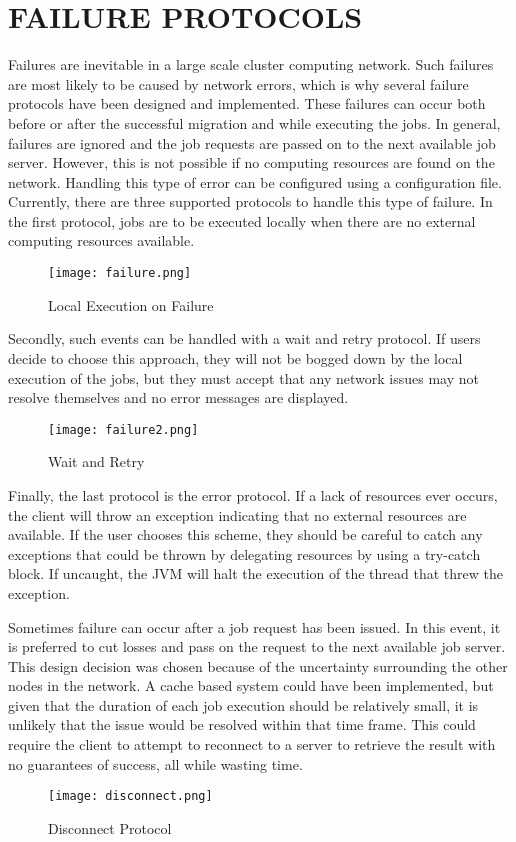 \section{FAILURE PROTOCOLS}\label{sec:failureProtocols}

Failures are inevitable in a large scale cluster computing network.
Such failures are most likely to be caused by network errors, which
is why several failure protocols have been designed and implemented.
These failures can occur both before or after the successful
migration and while executing the jobs.
In general, failures are ignored and the job requests are passed
on to the next available job server.
However, this is not possible if no computing resources are
found on the network.
Handling this type of error can be configured
using a configuration file.
Currently, there are three supported protocols to handle
this type of failure.
In the first protocol, jobs are to be executed locally when
there are no external computing resources available.

\begin{figure}[H]
    \centering
    \texttt{[image: failure.png]}
    \caption{Local Execution on Failure}
\end{figure}

Secondly, such events can be handled with a wait and retry protocol.
If users decide to choose this approach, they will not be bogged down
by the local execution of the jobs, but they must accept that any network
issues may not resolve themselves and no error messages are displayed.

\begin{figure}[H]
    \centering
    \texttt{[image: failure2.png]}
    \caption{Wait and Retry}
\end{figure}

Finally, the last protocol is the error protocol.
If a lack of resources ever occurs, the client will
throw an exception indicating that no external resources
are available.
If the user chooses this scheme, they should be careful
to catch any exceptions that could be thrown by delegating
resources by using a try-catch block.
If uncaught, the JVM will halt the execution of the thread
that threw the exception.

Sometimes failure can occur after a job request has been issued.
In this event, it is preferred to cut losses and pass on the request
to the next available job server.
This design decision was chosen because of the uncertainty surrounding
the other nodes in the network.
A cache based system could have been implemented, but given that the duration
of each job execution should be relatively small, it is unlikely that the issue
would be resolved within that time frame.
This could require the client to attempt to reconnect to a server to retrieve
the result with no guarantees of success, all while wasting time.

\begin{figure}[H]
    \centering
    \texttt{[image: disconnect.png]}
    \caption{Disconnect Protocol}
\end{figure}
